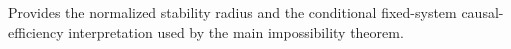 Provides the normalized stability radius and the conditional fixed-system causal-efficiency interpretation used by the main impossibility theorem.